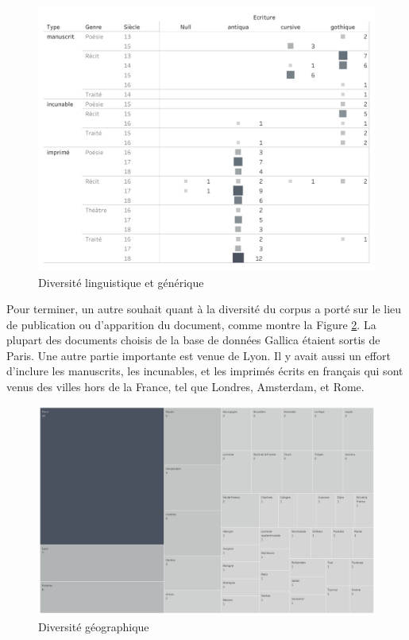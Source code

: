 \documentclass[class=article, crop=false]{standalone}
\begin{document}
\begin{figure}[hbt!]
\includegraphics[width=\textwidth]{../../../images/diversite_genre.png}
\caption{Diversité linguistique et générique}
\label{fig:diversite_genre}
\end{figure} 

Pour terminer, un autre souhait quant à la diversité du corpus a porté sur le lieu de publication ou d'apparition du document, comme montre la Figure \ref{fig:diversite_ville}. La plupart des documents choisis de la base de données Gallica étaient sortis de Paris. Une autre partie importante est venue de Lyon. Il y avait aussi un effort d'inclure les manuscrits, les incunables, et les imprimés écrits en français qui sont venus des villes hors de la France, tel que Londres, Amsterdam, et Rome.

\begin{figure}[hbt!]
\includegraphics[width=\textwidth]{../../../images/diversite_ville.png}
\caption{Diversité géographique}
\label{fig:diversite_ville}
\end{figure}
\end{document}
